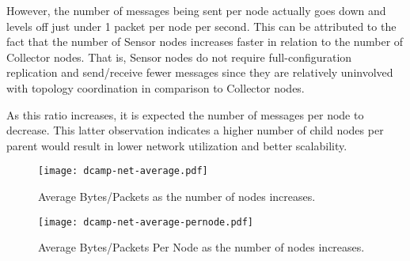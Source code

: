 However, the number of messages being sent per node actually goes down and levels off just under 1 packet per node per
second. This can be attributed to the fact that the number of Sensor nodes increases faster in relation to the number of
Collector nodes. That is, Sensor nodes do not require full-configuration replication and send/receive fewer messages
since they are relatively uninvolved with topology coordination in comparison to Collector nodes.

As this ratio increases, it is expected the number of messages per node to decrease. This latter observation indicates a
higher number of child nodes per parent would result in lower network utilization and better \dcamp scalability.

\begin{figure}[H]
    \centering
    \vspace{-20pt}
    \texttt{[image: dcamp-net-average.pdf]}
    \vspace{-40pt}
    \caption{Average Bytes/Packets as the number of \dcamp nodes increases.}
    \label{fig:net_avg_graph}
\end{figure}

\begin{figure}[H]
    \centering
    \vspace{-20pt}
    \texttt{[image: dcamp-net-average-pernode.pdf]}
    \vspace{-40pt}
    \caption{Average Bytes/Packets Per Node as the number of \dcamp nodes increases.}
    \label{fig:net_avg_pernode_graph}
\end{figure}
